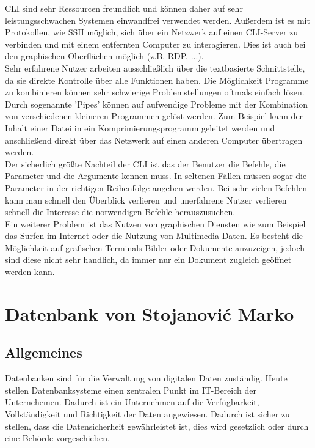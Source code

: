 \documentclass[12pt,a4paper]{report}
\begin{document}
CLI sind sehr Ressourcen freundlich und können daher auf sehr leistungsschwachen Systemen einwandfrei verwendet werden. Außerdem ist es mit Protokollen, wie SSH möglich, sich über ein Netzwerk auf einen CLI-Server zu verbinden und mit einem entfernten Computer zu interagieren. Dies ist auch bei den graphischen Oberflächen möglich (z.B. RDP, ...).\\

Sehr erfahrene Nutzer arbeiten ausschließlich über die textbasierte Schnittstelle, da sie direkte Kontrolle über alle Funktionen haben. Die Möglichkeit Programme zu kombinieren können sehr schwierige Problemstellungen oftmals einfach lösen. Durch sogenannte 'Pipes' können auf aufwendige Probleme mit der Kombination von verschiedenen kleineren Programmen gelöst werden. Zum Beispiel kann der Inhalt einer Datei in ein Komprimierungsprogramm geleitet werden und anschließend direkt über das Netzwerk auf einen anderen Computer übertragen werden.\\

Der sicherlich größte Nachteil der CLI ist das der Benutzer die Befehle, die Parameter und die Argumente kennen muss. In seltenen Fällen müssen sogar die Parameter in der richtigen Reihenfolge angeben werden. Bei sehr vielen Befehlen kann man schnell den Überblick verlieren und unerfahrene Nutzer verlieren schnell die Interesse die notwendigen Befehle herauszusuchen.\\

Ein weiterer Problem ist das Nutzen von graphischen Diensten wie zum Beispiel das Surfen im Internet oder die Nutzung von Multimedia Daten. Es besteht die Möglichkeit auf grafischen Terminals Bilder oder Dokumente anzuzeigen, jedoch sind diese nicht sehr handlich, da immer nur ein Dokument zugleich geöffnet werden kann.\\

\chapter{Datenbank von Stojanovi\'{c} Marko}
\section{Allgemeines}
Datenbanken sind für die Verwaltung von digitalen Daten zuständig. Heute stellen Datenbanksysteme einen zentralen Punkt im IT-Bereich der Unternehemen. Dadurch ist ein Unternehmen auf die Verfügbarkeit, Vollständigkeit und Richtigkeit der Daten angewiesen. Dadurch ist sicher zu stellen, dass die Datensicherheit gewährleistet ist, dies wird gesetzlich oder durch eine Behörde vorgeschieben.\\
\end{document}
